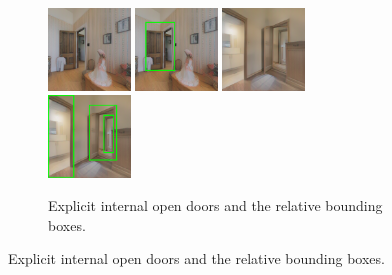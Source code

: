 \begin{figure}[h!]
	\begin{subfigure}[b]{\linewidth}
		\centering
		\includegraphics[width=0.24\textwidth]{images/explicitinternalopen1.png}
		\hfill
		\includegraphics[width=0.24\textwidth]{images/explicitinternalopen1boxed.png}
		\hfill
		\includegraphics[width=0.24\textwidth]{images/explicitinternalopen2.png}
		\hfill
		\includegraphics[width=0.24\textwidth]{images/explicitinternalopen2boxed.png}
		\caption{Explicit internal open doors and the relative bounding boxes.}
	\end{subfigure}
	

\end{figure}
